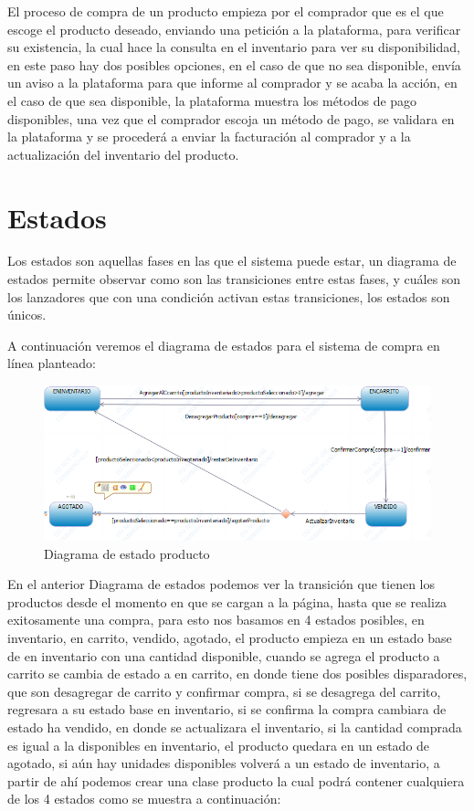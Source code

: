\newpage

El proceso de compra de un producto empieza por el comprador que es el que escoge el producto deseado, enviando una petición a la plataforma, para verificar su existencia, la cual hace la consulta en el inventario para ver su disponibilidad, en este paso hay dos posibles opciones, en el caso de que no sea disponible, envía un aviso a la plataforma para que informe al comprador y se acaba la acción, en el caso de que sea disponible, la plataforma muestra los métodos de pago disponibles, una vez que el comprador escoja un método de pago, se validara en la plataforma y se procederá a enviar la facturación al comprador y a la actualización del inventario del producto.


\newpage

\section{Estados}
Los estados son aquellas fases en las que el sistema puede estar, un diagrama de estados permite observar como son las transiciones entre estas fases, y cuáles son los lanzadores que con una condición activan estas transiciones, los estados son únicos. 

A continuación veremos el diagrama de estados para el sistema de compra en línea planteado:

\begin{figure}[th!]
	\centering
	\includegraphics[width=0.9\linewidth]{arquitectura/imagenes/diagramas_estados}
	\caption{Diagrama de estado producto}
\end{figure}

En el anterior Diagrama de estados podemos ver la transición que tienen los productos desde el momento en que se cargan a la página, hasta que se realiza exitosamente una  compra, para esto nos basamos en 4 estados posibles, en inventario, en carrito, vendido, agotado, el producto empieza en un estado base de en inventario con una cantidad disponible, cuando se agrega el producto a carrito se cambia de estado a en carrito, en donde tiene dos posibles disparadores, que son desagregar de carrito y confirmar compra, si se desagrega del carrito, regresara a su estado base en inventario, si se confirma la compra cambiara de estado ha vendido, en donde se actualizara el inventario, si la cantidad comprada es igual a la disponibles en inventario, el producto quedara en un estado de agotado, si aún hay unidades disponibles volverá a un estado de inventario, a partir de ahí podemos crear una clase producto la cual podrá contener cualquiera de los 4 estados como se muestra a continuación:


